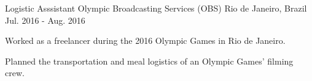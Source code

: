   \cventry
    {Logistic Asssistant} %
    {Olympic Broadcasting Services (OBS)} %
    {Rio de Janeiro, Brazil} %
    {Jul. 2016 - Aug. 2016} %
    {
      \begin{cvitems} %
        \item {Worked as a freelancer during the 2016 Olympic Games in Rio de Janeiro.}
        \item {Planned the transportation and meal logistics of an Olympic Games’ filming crew.}
      \end{cvitems}
    }

